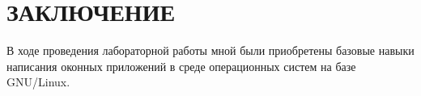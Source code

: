 \section*{ЗАКЛЮЧЕНИЕ}

В ходе проведения лабораторной работы мной были приобретены базовые 
навыки написания оконных приложений в среде операционных систем на
базе GNU/Linux.

\newpage

